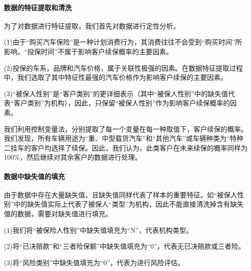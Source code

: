 \documentclass[UTF8,12pt,songti]{ctexart}
\begin{document}
\paragraph{数据的特征提取和清洗}  \quad \par     %
为了对数据进行特征提取，我们首先对数据进行定性分析。\par
(1)由于“购买汽车保险”是一种计划消费行为，其消费往往不会受到“购买时间”所影响。“投保时间”不属于影响客户续保概率的主要因素。\par
(2)投保的车系，品牌和汽车价格，属于关联性极强的因素。在数据特征提取过程中，我们选取了其中特征性最强的汽车价格作为影响客户续保的主要因素。\par
(3)“被保人性别”是“客户类别”的更详细表示（其中“被保人性别”中的缺失值代表“客户类别”为机构），因此，只保留“被保人性别”作为影响客户续保概率的因素。\par
我们利用控制变量法，分别提取了每一个变量在每一种取值下，客户续保的概率。我们发现，所有车辆用途为“重、中型载货汽车”和“其他汽车”或车辆种类为“特种二挂车的客户均选择了续保。因此，我们认为，此类客户在未来续保的概率同样为100\%，然后继续对其余客户的数据进行处理。
\paragraph{数据中缺失值的填充} \quad \par
由于数据中存在大量缺失值，且缺失值同样代表了样本的重要特征。如“被保人性别”中的缺失值实际上代表了被保人“类型”为机构，因此不能直接清洗掉含有缺失值的数据，需要对缺失值进行填充。\par
(1)我们将“被保险人性别”中缺失值填充为“N”，代表机构类型。\par
(2)将“已决赔款”和“三者险保额”中缺失值填充为“0”，代表无已决赔款或三者险。\par
(3)将“风险类别”中缺失值填充为“0”，代表为进行风险评估。
\end{document}
